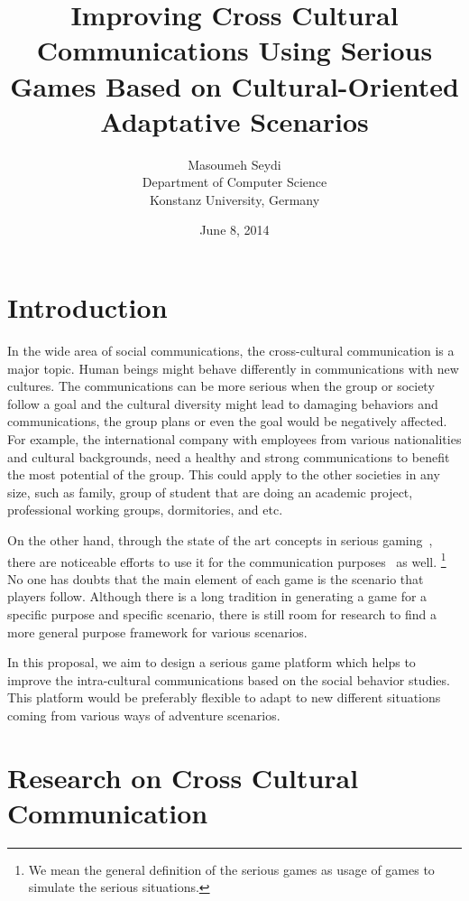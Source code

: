 \documentclass[conference]{IEEEtran}
\title{Improving Cross Cultural Communications Using Serious Games
Based on Cultural-Oriented Adaptative Scenarios}
\date{June 8, 2014}
\author{Masoumeh Seydi\\ Department of Computer Science\\
       Konstanz University, Germany}
\begin{document}
\maketitle

\section{Introduction}

In the wide area of social communications, the cross-cultural communication is 
a major topic. Human beings might behave differently in communications with
new cultures. The communications can be more serious when the group or society 
follow a goal and the cultural diversity might lead to damaging behaviors and communications,
the group plans or even the goal would be negatively affected.
For example, the international company with employees from various nationalities
and cultural backgrounds, need a healthy and strong communications to benefit the most potential
of the group. This could apply to the other societies in any size, such as family, group of student that
are doing an academic project, professional working groups, dormitories, and etc. 

On the other hand, through the state of the art concepts in serious gaming~\cite{sergame1,sergame2}, 
there are noticeable efforts to use it for the communication purposes~\cite{sergame3} as well.
\footnote{We mean the general definition of the serious games as 
usage of games to simulate the serious situations.}
No one has doubts that the main element of each game is 
the scenario that players follow.
Although there is a long tradition in generating a game
for a specific purpose and specific scenario, 
there is still room for research 
to find a more general purpose framework for various scenarios.

In this proposal, we aim to design a serious game platform which helps to 
improve the intra-cultural communications based on the social behavior studies.
This platform would be preferably flexible to adapt to new different situations coming
from various ways of adventure scenarios. 

\section{Research on Cross Cultural Communication}
\end{document}
